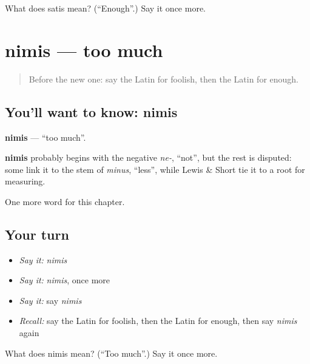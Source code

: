 \begin{tcolorbox}[breakable,colback=teal!4,colframe=teal!35!black,title={Before you move on}]
What does satis mean? (\textquotedblleft{}Enough\textquotedblright{}.) Say it once more.
\end{tcolorbox}
\section[nimis]{nimis — too much}

\label{lesson:LA-C98-nimis}



\begin{quote}
Before the new one: say the Latin for foolish, then the Latin for enough.
\end{quote}

\subsection*{You'll want to know: nimis}
\textbf{nimis} — \textquotedblleft{}too much\textquotedblright{}.

\begin{cousinweb}
\textbf{nimis} probably begins with the negative \emph{ne-}, \textquotedblleft{}not\textquotedblright{}, but the rest is disputed: some link it to the stem of \emph{minus}, \textquotedblleft{}less\textquotedblright{}, while Lewis \& Short tie it to a root for measuring.
\end{cousinweb}

\begin{grammarlens}[title={What you've built}]
One more word for this chapter.
\end{grammarlens}

\subsection*{Your turn}
\begin{itemize}
\raggedright
  \item \emph{Say it:} \emph{nimis}
  \item \emph{Say it:} \emph{nimis}, once more
  \item \emph{Say it:} say \emph{nimis}
  \item \emph{Recall:} say the Latin for foolish, then the Latin for enough, then say \emph{nimis} again
\end{itemize}

\begin{tcolorbox}[breakable,colback=teal!4,colframe=teal!35!black,title={Before you move on}]
What does nimis mean? (\textquotedblleft{}Too much\textquotedblright{}.) Say it once more.
\end{tcolorbox}
